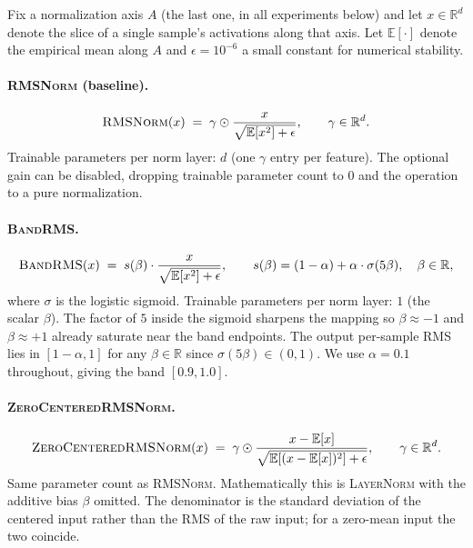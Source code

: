 \documentclass{article}
\newcommand{\R}{\mathbb{R}}
\newcommand{\E}{\mathbb{E}}
\newcommand{\rms}{\textsc{RMSNorm}}
\newcommand{\bandrms}{\textsc{BandRMS}}
\newcommand{\zcrms}{\textsc{ZeroCentered}\-\textsc{RMSNorm}}
\newcommand{\layernorm}{\textsc{LayerNorm}}
\begin{document}
Fix a normalization axis $A$ (the last one, in all experiments below) and let $x \in \R^d$ denote the slice of a single sample's activations along that axis.
Let $\E[\cdot]$ denote the empirical mean along $A$ and $\epsilon = 10^{-6}$ a small constant for numerical stability.

\paragraph{\rms{} (baseline).}
\begin{equation}
  \rms(x) \;=\; \gamma \odot \frac{x}{\sqrt{\E[x^2] + \epsilon}},
  \qquad \gamma \in \R^d.
  \label{eq:rmsnorm}
\end{equation}
Trainable parameters per norm layer: $d$ (one $\gamma$ entry per feature). The optional gain can be disabled, dropping trainable parameter count to $0$ and the operation to a pure normalization.

\paragraph{\bandrms{}.}
\begin{equation}
  \bandrms(x) \;=\; s(\beta) \cdot \frac{x}{\sqrt{\E[x^2] + \epsilon}},
  \qquad s(\beta) = (1-\alpha) + \alpha \cdot \sigma(5\beta), \quad \beta \in \R,
  \label{eq:bandrms}
\end{equation}
where $\sigma$ is the logistic sigmoid.
Trainable parameters per norm layer: $1$ (the scalar $\beta$). The factor of $5$ inside the sigmoid sharpens the mapping so $\beta \approx -1$ and $\beta \approx +1$ already saturate near the band endpoints.
The output per-sample RMS lies in $[1-\alpha, 1]$ for any $\beta \in \R$ since $\sigma(5\beta) \in (0, 1)$.
We use $\alpha = 0.1$ throughout, giving the band $[0.9, 1.0]$.

\paragraph{\zcrms{}.}
\begin{equation}
  \zcrms(x) \;=\; \gamma \odot \frac{x - \E[x]}{\sqrt{\E[(x - \E[x])^2] + \epsilon}},
  \qquad \gamma \in \R^d.
  \label{eq:zcrms}
\end{equation}
Same parameter count as \rms{}. Mathematically this is \layernorm{} with the additive bias $\beta$ omitted.
The denominator is the standard deviation of the centered input rather than the RMS of the raw input; for a zero-mean input the two coincide.
\end{document}
